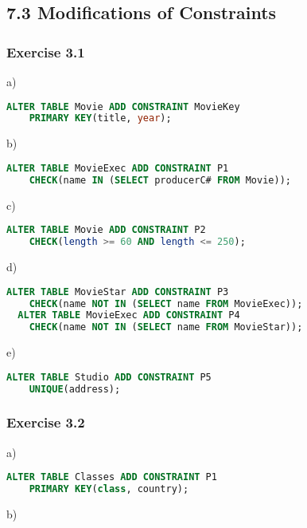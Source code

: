 \documentclass[../../main.tex]{subfiles}
\begin{document}
\subsection{7.3 Modifications of Constraints}

\subsubsection*{Exercise 3.1}

a)

\begin{lstlisting}[language=sql]
  ALTER TABLE Movie ADD CONSTRAINT MovieKey
    PRIMARY KEY(title, year);
\end{lstlisting}

b)

\begin{lstlisting}[language=sql]
  ALTER TABLE MovieExec ADD CONSTRAINT P1
    CHECK(name IN (SELECT producerC# FROM Movie));
\end{lstlisting}

c)

\begin{lstlisting}[language=sql]
  ALTER TABLE Movie ADD CONSTRAINT P2
    CHECK(length >= 60 AND length <= 250);
\end{lstlisting}

d)

\begin{lstlisting}[language=sql]
  ALTER TABLE MovieStar ADD CONSTRAINT P3
    CHECK(name NOT IN (SELECT name FROM MovieExec));
  ALTER TABLE MovieExec ADD CONSTRAINT P4
    CHECK(name NOT IN (SELECT name FROM MovieStar));
\end{lstlisting}

e)

\begin{lstlisting}[language=sql]
  ALTER TABLE Studio ADD CONSTRAINT P5
    UNIQUE(address);
\end{lstlisting}

\subsubsection*{Exercise 3.2}

a)

\begin{lstlisting}[language=sql]
  ALTER TABLE Classes ADD CONSTRAINT P1
    PRIMARY KEY(class, country);
\end{lstlisting}

b)
\end{document}
